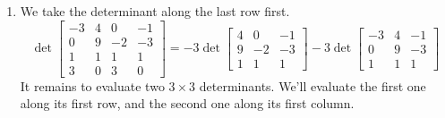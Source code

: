 \documentclass[12pt]{article}
\begin{document}
\begin{enumerate}
\begin{enumerate}
\begin{gather*}
\begin{bmatrix}
                              \end{bmatrix}\right)=\begin{bmatrix}
                                    1 \\ 3 \\ 2 \\ 4
                              \end{bmatrix} \\
                              (f_\beta \circ T)(M)=f_\beta\left(\begin{bmatrix}
                                    1 & 3 \\
                                    2 & 4
                              \end{bmatrix}\right)=\begin{bmatrix}
                                    1 \\ 3 \\ 2 \\ 4
                              \end{bmatrix}
                        \end{gather*}
                        Yeah, these two are equal (at least for this particular matrix).
            \end{enumerate}
      \item We take the determinant along the last row first.
            \[\det \begin{bmatrix}
                        -3 & 4 & 0  & -1 \\
                        0  & 9 & -2 & -3 \\
                        1  & 1 & 1  & 1  \\
                        3  & 0 & 3  & 0
                  \end{bmatrix}=-3\det \begin{bmatrix}
                        4 & 0  & -1 \\
                        9 & -2 & -3 \\
                        1 & 1  & 1
                  \end{bmatrix}-3\det \begin{bmatrix}
                        -3 & 4 & -1 \\
                        0  & 9 & -3 \\
                        1  & 1 & 1
                  \end{bmatrix}\]
            It remains to evaluate two $3 \times 3$ determinants.
            We'll evaluate the first one along its first row, and the second one along its first column.

\end{enumerate}
\end{document}
